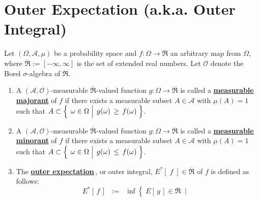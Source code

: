 

\section{Outer Expectation (a.k.a. Outer Integral)}
\setcounter{theorem}{0}
\setcounter{equation}{0}


\renewcommand{\theenumi}{\roman{enumi}}
\renewcommand{\labelenumi}{\textnormal{(\theenumi)}$\;\;$}


\begin{definition}
\label{defn:MajorantsOuterExpectation}
\mbox{}\vskip 0.1cm
\noindent
Let $(\Omega,\mathcal{A},\mu)$ be a probability space and
$f : \Omega \longrightarrow \overline{\Re}$
an arbitrary map from $\Omega$, where $\overline{\Re} := [-\infty,\infty]$ is the set of extended real numbers.
Let $\mathcal{O}$ denote the Borel $\sigma$-algebra of $\Re$.
\begin{enumerate}
\item
	A $(\mathcal{A},\mathcal{O})$-measurable $\overline{\Re}$-valued function
	$g : \Omega\longrightarrow\overline{\Re}$
	is called a \underline{\textbf{measurable majorant}} of $f$ if there exists a measurable
	subset $A \in \mathcal{A}$ with $\mu(A) = 1$ such that
	$A \subset \left\{\;\left.\omega\overset{{\color{white}.}}{\in}\Omega\;\right\vert\; g(\omega) \,\geq\, f(\omega)\;\right\}$.
\item
	A $(\mathcal{A},\mathcal{O})$-measurable $\overline{\Re}$-valued function
	$g : \Omega\longrightarrow\overline{\Re}$
	is called a \underline{\textbf{measurable minorant}} of $f$ if there exists a measurable
	subset $A \in \mathcal{A}$ with $\mu(A) = 1$ such that
	$A \subset \left\{\;\left.\omega\overset{{\color{white}.}}{\in}\Omega\;\right\vert\; g(\omega) \,\leq\, f(\omega)\;\right\}$.
\item\label{defn:OuterExpectation}
	The \underline{\textbf{outer expectation}}\,, or outer integral,
	$E^{*}\!\left[\;f\;\right] \in \overline{\Re}$
	of $f$ is defined as follows:
	\begin{equation*}
	E^{*}\!\left[\,f\,\right]
	\;\; := \;\;
		\inf\!\left\{\;
			E\!\left[\,g\,\right] \in \overline{\Re}
			\;\;\left\vert\;
			\begin{array}{c}

\end{array}
\end{equation*}
\end{enumerate}
\end{definition}
